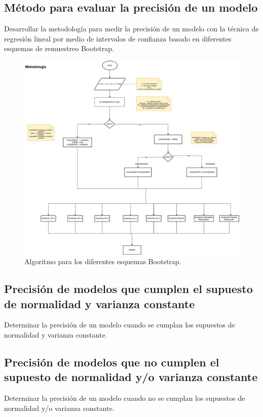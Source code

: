 \vspace{1.5cm}
\subsection{Método para evaluar la precisión de un modelo}

Desarrollar la metodología para medir la precisión de un modelo con la técnica de regresión lineal por medio de intervalos de confianza basado en diferentes esquemas de remuestreo Bootstrap. 

\begin{figure}[ht] 
	\centering 
	\includegraphics[width=0.98\linewidth]{img/metodologia.png} 
	\caption{Algoritmo para los diferentes esquemas Bootstrap.} 
\end{figure}




	\vspace{1.5cm}
	\subsection{Precisión de modelos que cumplen el supuesto de normalidad y varianza constante}
	 Determinar la precisión de un modelo cuando se cumplan los supuestos de normalidad y varianza constante.
	 \vspace{1.5cm}
	 
	 
	 
	 
	 
	 \subsection{Precisión de modelos que no cumplen el supuesto de normalidad y/o varianza constante}
	 Determinar la precisión de un modelo cuando no se cumplan los supuestos de normalidad y/o varianza constante.
	 \vspace{1.5cm}
	 	 
